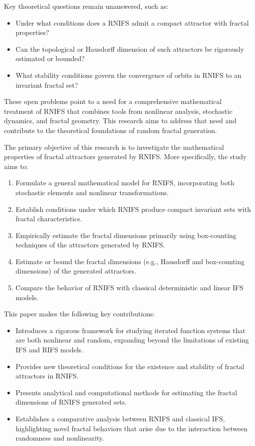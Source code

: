 \documentclass[twocolumn,10pt]{article}
\begin{document}
Key theoretical questions remain unanswered, such as:
\begin{itemize}
    \item Under what conditions does a RNIFS admit a compact attractor with fractal properties?
    \item Can the topological or Hausdorff dimension of such attractors be rigorously estimated or bounded?
    \item What stability conditions govern the convergence of orbits in RNIFS to an invariant fractal set?
\end{itemize}

These open problems point to a need for a comprehensive mathematical treatment of RNIFS that combines tools from nonlinear analysis, stochastic dynamics, and fractal geometry. This research aims to address that need and contribute to the theoretical foundations of random fractal generation.

The primary objective of this research is to investigate the mathematical properties of fractal attractors generated by RNIFS. More specifically, the study aims to:
\vspace{-0.6em}
\begin{enumerate}
    \item Formulate a general mathematical model for RNIFS, incorporating both stochastic elements and nonlinear transformations.
    \item Establish conditions under which RNIFS produce compact invariant sets with fractal characteristics.
    \item Empirically estimate the fractal dimensions primarily using box-counting techniques of the attractors generated by RNIFS.
    \item Estimate or bound the fractal dimensions (e.g., Hausdorff and box-counting dimensions) of the generated attractors.
    \item Compare the behavior of RNIFS with classical deterministic and linear IFS models.
\end{enumerate}

This paper makes the following key contributions:
\vspace{-0.8em}
\begin{itemize}
    \item Introduces a rigorous framework for studying iterated function systems that are both nonlinear and random, expanding beyond the limitations of existing IFS and RIFS models.
    \item Provides new theoretical conditions for the existence and stability of fractal attractors in RNIFS.
    \item Presents analytical and computational methods for estimating the fractal dimensions of RNIFS generated sets.
    \item Establishes a comparative analysis between RNIFS and classical IFS, highlighting novel fractal behaviors that arise due to the interaction between randomness and nonlinearity.
\end{itemize}
\end{document}

